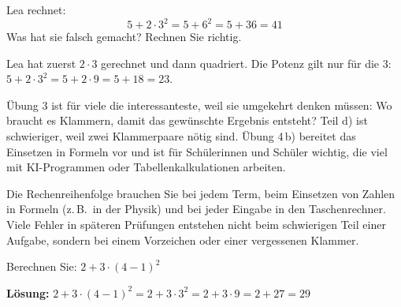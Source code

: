 \documentclass[11pt]{exam}
\begin{document}
\begin{questions}
\question Lea rechnet:
\[ 5 + 2 \cdot 3^2 = 5 + 6^2 = 5 + 36 = 41 \]
Was hat sie falsch gemacht? Rechnen Sie richtig.
\begin{solution}
  Lea hat zuerst $2 \cdot 3$ gerechnet und dann quadriert. Die Potenz gilt nur
  für die $3$: \ $5 + 2 \cdot 3^2 = 5 + 2 \cdot 9 = 5 + 18 = 23$.
\end{solution}
\raum{2.5cm}

\end{questions}

\begin{lehrperson}[Übungen]
Übung 3 ist für viele die interessanteste, weil sie umgekehrt denken müssen:
Wo braucht es Klammern, damit das gewünschte Ergebnis entsteht? Teil d) ist
schwieriger, weil zwei Klammerpaare nötig sind. Übung 4\,b) bereitet das
Einsetzen in Formeln vor und ist für Schülerinnen und Schüler wichtig, die
viel mit KI-Programmen oder Tabellenkalkulationen arbeiten.
\end{lehrperson}


\begin{ausblick}
Die Rechenreihenfolge brauchen Sie bei jedem Term, beim Einsetzen von Zahlen
in Formeln (z.\,B.\ in der Physik) und bei jeder Eingabe in den Taschenrechner.
Viele Fehler in späteren Prüfungen entstehen nicht beim schwierigen Teil einer
Aufgabe, sondern bei einem Vorzeichen oder einer vergessenen Klammer.
\end{ausblick}

\begin{exitfrage}
Berechnen Sie: \quad $2 + 3 \cdot (4 - 1)^2$
\ifprintanswers\par\medskip\textbf{Lösung:}
$2 + 3 \cdot (4 - 1)^2 = 2 + 3 \cdot 3^2 = 2 + 3 \cdot 9 = 2 + 27 = 29$
\else\par\vspace{2cm}\fi
\end{exitfrage}
\end{document}
